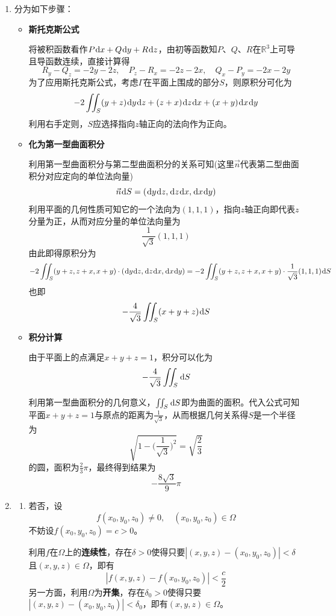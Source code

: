 \documentclass[a4paper,UTF8,fontset=windows,AutoFakeBold]{ctexart}
\newcommand*{\dr}{\hspace{0.07em}\mathrm{d}}
\newcommand*{\rb}{\mathbb{R}}
\theoremstyle{ex}
\begin{document}
\begin{enumerate}
\begin{itemize}
    \end{itemize}

    \item 分为如下步骤：
    \begin{itemize}
        \item \textbf{斯托克斯公式}
        
        将被积函数看作$P\dr x+Q\dr y+R\dr z$，由初等函数知$P$、$Q$、$R$在$\rb^3$上可导且导函数连续，直接计算得
        $$R_y-Q_z=-2y-2z,\quad P_z-R_x=-2z-2x,\quad Q_x-P_y=-2x-2y$$
        为了应用斯托克斯公式，考虑$\Gamma$在平面上围成的部分$S$，则原积分可化为
        $$-2\iint_S(y+z)\dr y\dr z+(z+x)\dr z\dr x+(x+y)\dr x\dr y$$
        利用右手定则，$S$应选择指向$z$轴正向的法向作为正向。

        \item \textbf{化为第一型曲面积分}
            
        利用第一型曲面积分与第二型曲面积分的关系可知(这里$\vec{n}$代表第二型曲面积分对应定向的单位法向量)
        $$\vec{n}\dr S=(\dr y\dr z,\dr z\dr x,\dr x\dr y)$$
        利用平面的几何性质可知它的一个法向为$(1,1,1)$，指向$z$轴正向即代表$z$分量为正，从而对应分量的单位法向量为
        $$\frac{1}{\sqrt3}(1,1,1)$$
        由此即得原积分为
        $$-2\iint_S(y+z,z+x,x+y)\cdot(\dr y\dr z,\dr z\dr x,\dr x\dr y)=-2\iint_S(y+z,z+x,x+y)\cdot\frac{1}{\sqrt3}(1,1,1)\dr S$$
        也即
        $$-\frac{4}{\sqrt3}\iint_S(x+y+z)\dr S$$

        \item \textbf{积分计算}
            
        由于平面上的点满足$x+y+z=1$，积分可以化为
        $$-\frac{4}{\sqrt3}\iint_S\dr S$$

        利用第一型曲面积分的几何意义，$\iint_S\dr S$即为曲面的面积。代入公式可知平面$x+y+z=1$与原点的距离为$\frac{1}{\sqrt3}$，从而根据几何关系得$S$是一个半径为
        $$\sqrt{1-\bigg(\frac{1}{\sqrt3}\bigg)^2}=\sqrt{\frac{2}{3}}$$
        的圆，面积为$\frac{2}{3}\pi$，最终得到结果为
        $$-\frac{8\sqrt3}{9}\pi$$
    \end{itemize}
    
    \item
    \begin{enumerate}[(1)]
        \item 若否，设
        $$f(x_0,y_0,z_0)\ne0,\quad(x_0,y_0,z_0)\in\Omega$$
        不妨设$f(x_0,y_0,z_0)=c>0$。

        利用$f$在$\Omega$上的\textbf{连续性}，存在$\delta>0$使得只要$|(x,y,z)-(x_0,y_0,z_0)|<\delta$且$(x,y,z)\in\Omega$，即有
        $$|f(x,y,z)-f(x_0,y_0,z_0)|<\frac{c}{2}$$
        另一方面，利用$\Omega$为\textbf{开集}，存在$\delta_0>0$使得只要$|(x,y,z)-(x_0,y_0,z_0)|<\delta_0$，即有$(x,y,z)\in\Omega$。


\end{enumerate}
\end{enumerate}
\end{document}
